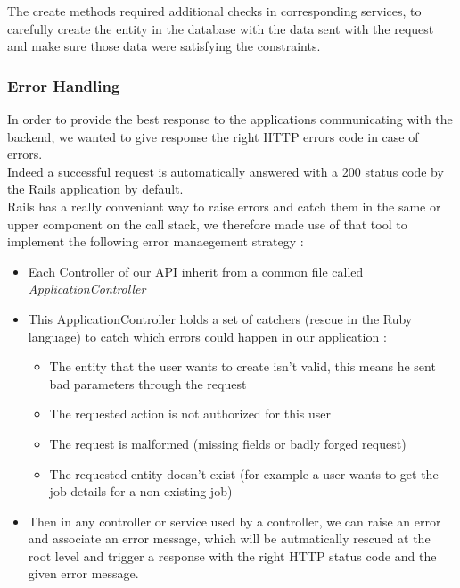 \documentclass{eplmastersthesis}
\begin{document}
          The create methods required additional checks in corresponding
          services, to carefully create the entity in the database with
          the data sent with the request and make sure those data were
          satisfying the constraints.\\

        \subsubsection{Error Handling}

          In order to provide the best response to the applications
          communicating with the backend, we wanted to give response
          the right HTTP errors code in case of errors.\\

          Indeed a successful request is automatically answered with a 200
          status code by the Rails application by default.\\
          Rails has a really conveniant way to raise errors and catch them
          in the same or upper component on the call stack, we therefore
          made use of that tool to implement the following error manaegement
          strategy :

          \begin{itemize}
            \item Each Controller of our API inherit from a common file
            called \textit{ApplicationController}
            \item This ApplicationController holds a set of catchers (rescue
            in the Ruby language) to catch which errors could happen in our
            application :
              \begin{itemize}
                \item The entity that the user wants to create isn't valid, this
                means he sent bad parameters through the request
                \item The requested action is not authorized for this user
                \item The request is malformed (missing fields or badly forged
                request)
                \item The requested entity doesn't exist (for example a user
                wants to get the job details for a non existing job)
              \end{itemize}
            \item Then in any controller or service used by a controller, we
            can raise an error and associate an error message, which will be
            autmatically rescued at the root level and trigger a response with
            the right HTTP status code and the given error message.
          \end{itemize}
\end{document}
